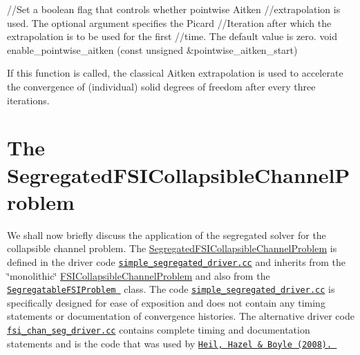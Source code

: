 \begin{DoxyEnumerate}
\begin{DoxyCode}
\textcolor{comment}{//Set a boolean flag that controls whether pointwise Aitken}
\textcolor{comment}{//extrapolation is used. The optional argument specifies the Picard}
\textcolor{comment}{//Iteration after which the extrapolation is to be used for the first}
\textcolor{comment}{//time. The default value is zero.}
\textcolor{keywordtype}{void} enable\_pointwise\_aitken (\textcolor{keyword}{const} \textcolor{keywordtype}{unsigned} &pointwise\_aitken\_start)
\end{DoxyCode}
 If this function is called, the classical Aitken extrapolation is used to accelerate the convergence of (individual) solid degrees of freedom after every three iterations.
\end{DoxyEnumerate}

 

\hypertarget{index_channel_seg_problem}{}\section{The Segregated\+F\+S\+I\+Collapsible\+Channel\+Problem}\label{index_channel_seg_problem}
We shall now briefly discuss the application of the segregated solver for the collapsible channel problem. The {\ttfamily \hyperlink{classSegregatedFSICollapsibleChannelProblem}{Segregated\+F\+S\+I\+Collapsible\+Channel\+Problem}} is defined in the driver code {\ttfamily \href{../../../../demo_drivers/interaction/fsi_channel_seg_and_precond/simple_segregated_driver.cc}{\tt simple\+\_\+segregated\+\_\+driver.\+cc} } and inherits from the \char`\"{}monolithic\char`\"{} {\ttfamily \hyperlink{classFSICollapsibleChannelProblem}{F\+S\+I\+Collapsible\+Channel\+Problem}} and also from the \href{../../../the_data_structure/html/classoomph_1_1SegregatableFSIProblem.html}{\tt {\ttfamily Segregatable\+F\+S\+I\+Problem} } class. The code {\ttfamily  \href{../../../../demo_drivers/interaction/fsi_channel_seg_and_precond/simple_segregated_driver.cc}{\tt simple\+\_\+segregated\+\_\+driver.\+cc} } is specifically designed for ease of exposition and does not contain any timing statements or documentation of convergence histories. The alternative driver code {\ttfamily  \href{../../../../demo_drivers/interaction/fsi_channel_seg_and_precond/fsi_chan_seg_driver.cc}{\tt fsi\+\_\+chan\+\_\+seg\+\_\+driver.\+cc}} contains complete timing and documentation statements and is the code that was used by \href{http://www.springerlink.com/content/m3r6318701g338g4/}{\tt Heil, Hazel \& Boyle (2008). }

